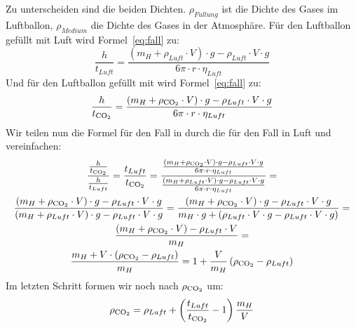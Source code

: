 \documentclass{article}
\begin{document}
      Zu unterscheiden sind die beiden Dichten. \(\rho_{F\ddot{u}llung}\) ist die Dichte des Gases im Luftballon, \(\rho_{Medium}\) die Dichte des Gases in der Atmosphäre.
      Für den Luftballon gefüllt mit Luft wird Formel~\ref{eq:fall} zu:
      \begin{equation} \label{eq:fall_luft}
          \frac{h}{t_{Luft}} = \frac{ \left( m_H + \rho_{Luft} \cdot V \right) \cdot g - \rho_{Luft} \cdot V \cdot g }{ 6 \pi \cdot r \cdot \eta_{Luft} }
      \end{equation}
      Und für den Luftballon gefüllt mit  wird Formel~\ref{eq:fall} zu:
      \begin{equation} \label{eq:fall_co2}
          \frac{h}{t_{\ce{CO2}}} = \frac{ \left( m_H + \rho_{\ce{CO2}} \cdot V \right) \cdot g - \rho_{Luft} \cdot V \cdot g }{ 6 \pi \cdot r \cdot \eta_{Luft} }
      \end{equation}
      Wir teilen nun die Formel für den Fall in  durch die für den Fall in Luft und vereinfachen:
      \begin{equation} \label{eq:calc_rho_faktor}
          \begin{gathered}
              \frac{ \frac{h}{t_{\ce{CO2}}} }{ \frac{h}{t_{Luft}} } = \frac{ t_{Luft} }{ t_{\ce{CO2}} } =
              \frac{ \frac{ \left( m_H + \rho_{\ce{CO2}} \cdot V \right) \cdot g - \rho_{Luft} \cdot V \cdot g }{ 6 \pi \cdot r \cdot \eta_{Luft} } }
              { \frac{ \left( m_H + \rho_{Luft} \cdot V \right) \cdot g - \rho_{Luft} \cdot V \cdot g }{ 6 \pi \cdot r \cdot \eta_{Luft} } } = \\
              \frac{ \left( m_H + \rho_{\ce{CO2}} \cdot V \right) \cdot g - \rho_{Luft} \cdot V \cdot g }{ \left( m_H + \rho_{Luft} \cdot V \right) \cdot g - \rho_{Luft} \cdot V \cdot g } =
              \frac{ \left( m_H + \rho_{\ce{CO2}} \cdot V \right) \cdot g - \rho_{Luft} \cdot V \cdot g }{ m_H \cdot g + \left( \rho_{Luft} \cdot V \cdot g - \rho_{Luft} \cdot V \cdot g \right) } = \\
              \frac{ \left( m_H + \rho_{\ce{CO2}} \cdot V \right) - \rho_{Luft} \cdot V }{ m_H } = \\
              \frac{ m_H + V \cdot \left( \rho_{\ce{CO2}} - \rho_{Luft} \right)}{ m_H } = 1 + \frac{V}{m_H} \left( \rho_{\ce{CO2}} - \rho_{Luft} \right)
          \end{gathered}
      \end{equation}
      Im letzten Schritt formen wir noch nach \(\rho_{\ce{CO2}}\) um:
      \begin{equation} \label{eq:calc_rho_co2}
          \rho_{\ce{CO2}} = \rho_{Luft} + \left( \frac{t_{Luft}}{t_{\ce{CO2}}} - 1 \right) \frac{m_H}{V}
      \end{equation}
\end{document}
